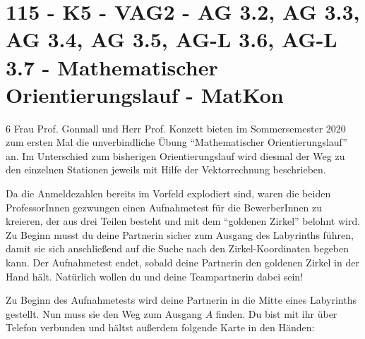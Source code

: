 \section{115 - K5 - VAG2 - AG 3.2, AG 3.3, AG 3.4, AG 3.5, AG-L 3.6, AG-L 3.7 - Mathematischer Orientierungslauf - MatKon}

\begin{langesbeispiel} \item[6] %
Frau Prof. Gonmall und Herr Prof. Konzett bieten im Sommersemester 2020 zum ersten Mal die unverbindliche Übung "`Mathematischer Orientierungslauf"' an. Im Unterschied zum bisherigen Orientierungslauf wird diesmal der Weg zu den einzelnen Stationen jeweils mit Hilfe der Vektorrechnung beschrieben. 

Da die Anmeldezahlen bereits im Vorfeld explodiert sind, waren die beiden ProfessorInnen gezwungen einen Aufnahmetest für die BewerberInnen zu kreieren, der aus drei Teilen besteht und mit dem "`goldenen Zirkel"' belohnt wird. Zu Beginn musst du deine Partnerin sicher zum Ausgang des Labyrinths führen, damit sie sich anschließend auf die Suche nach den Zirkel-Koordinaten begeben kann. Der Aufnahmetest endet, sobald deine Partnerin den goldenen Zirkel in der Hand hält. Natürlich wollen du und deine Teampartnerin dabei sein!%

\begin{aufgabenstellung}
\item Zu Beginn des Aufnahmetests wird deine Partnerin in die Mitte eines Labyrinths gestellt. Nun muss sie den Weg zum Ausgang $A$ finden. Du bist mit ihr über Telefon verbunden und hältst außerdem folgende Karte in den Händen:


\end{aufgabenstellung}
\end{langesbeispiel}
